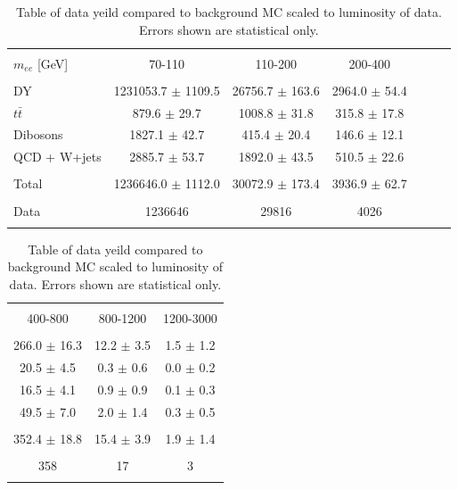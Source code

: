 	\begin{table}[h!]
	\centering %
	\begin{tabular}{l cccccc} %
	\hline\hline \\[-2ex] %
	$m_{ee}$ [GeV] & 70-110 & 110-200 & 200-400 \\  [0.2ex]
	\hline  \\[-2ex] %
	DY & 1231053.7 $\pm$ 1109.5 & 26756.7 $\pm$ 163.6 & 2964.0 $\pm$ 54.4 \\ 
	$t\bar{t}$ & 879.6 $\pm$ 29.7 & 1008.8 $\pm$ 31.8 & 315.8 $\pm$ 17.8 \\ 
	Dibosons & 1827.1 $\pm$ 42.7 & 415.4 $\pm$ 20.4 & 146.6 $\pm$ 12.1 \\ 
	QCD + W+jets & 2885.7 $\pm$ 53.7 & 1892.0 $\pm$ 43.5 & 510.5 $\pm$ 22.6 \\ [0.2ex]
	\hline  \\[-2ex] %
	Total & 1236646.0 $\pm$ 1112.0 & 30072.9 $\pm$ 173.4 & 3936.9 $\pm$ 62.7 \\ [0.2ex]
	\hline  \\[-2ex] %
	Data & 1236646 & 29816 & 4026 \\ [0.2ex]
	\hline\hline  \\ %
	\end{tabular}
	\begin{tabular}{ccc} %
	\hline\hline \\[-2ex] %
	400-800 & 800-1200 & 1200-3000 \\  [0.2ex]
	\hline  \\[-2ex] %
	266.0 $\pm$ 16.3 & 12.2 $\pm$ 3.5 & 1.5 $\pm$ 1.2 \\ 
	20.5 $\pm$ 4.5 & 0.3 $\pm$ 0.6 & 0.0 $\pm$ 0.2 \\ 
	16.5 $\pm$ 4.1 & 0.9 $\pm$ 0.9 & 0.1 $\pm$ 0.3 \\ 
	49.5 $\pm$ 7.0 & 2.0 $\pm$ 1.4 & 0.3 $\pm$ 0.5 \\ [0.2ex]
	\hline  \\[-2ex] %
	352.4 $\pm$ 18.8 & 15.4 $\pm$ 3.9 & 1.9 $\pm$ 1.4 \\ [0.2ex]
	\hline  \\[-2ex] %
	358 & 17 & 3 \\ [0.2ex]
	\hline\hline  \\ %
	\end{tabular}
	\caption{Table of data yeild compared to background MC scaled to luminosity of data. Errors shown are statistical only.} %
	\label{tab:dataMCyields}
	\end{table}




